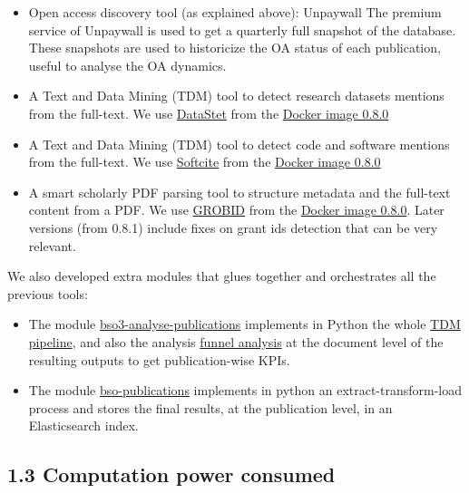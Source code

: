 \documentclass[
]{article}
\begin{document}
\begin{itemize}
\item
  Open access discovery tool (as explained above): Unpaywall The premium
  service of Unpaywall is used to get a quarterly full snapshot of the
  database. These snapshots are used to historicize the OA status of
  each publication, useful to analyse the OA dynamics.
\item
  A Text and Data Mining (TDM) tool to detect research datasets mentions
  from the full-text. We use
  \href{https://github.com/kermitt2/datastet}{DataStet} from the
  \href{https://hub.docker.com/r/grobid/datastet/tags}{Docker image
  0.8.0}
\item
  A Text and Data Mining (TDM) tool to detect code and software mentions
  from the full-text. We use
  \href{https://github.com/softcite/software-mentions}{Softcite} from
  the
  \href{https://hub.docker.com/r/grobid/software-mentions/tags}{Docker
  image 0.8.0}
\item
  A smart scholarly PDF parsing tool to structure metadata and the
  full-text content from a PDF. We use
  \href{https://github.com/kermitt2/grobid}{GROBID} from the
  \href{https://hub.docker.com/r/grobid/grobid/tags}{Docker image
  0.8.0}. Later versions (from 0.8.1) include fixes on grant ids
  detection that can be very relevant.
\end{itemize}

We also developed extra modules that glues together and orchestrates all
the previous tools:

\begin{itemize}
\item
  The module
  \href{https://github.com/dataesr/bso3-analyse-publications/blob/main/application/server/main/tasks.py\#L99}{bso3-analyse-publications}
  implements in Python the whole
  \href{https://github.com/dataesr/bso3-analyse-publications/blob/main/application/server/main/tasks.py\#L99}{TDM
  pipeline}, and also the analysis
  \href{https://github.com/dataesr/bso3-analyse-publications/blob/main/application/server/main/tasks.py\#L176}{funnel
  analysis} at the document level of the resulting outputs to get
  publication-wise KPIs.
\item
  The module
  \href{https://github.com/dataesr/bso-publications}{bso-publications}
  implements in python an extract-transform-load process and stores the
  final results, at the publication level, in an Elasticsearch index.
\end{itemize}

\hypertarget{computation-power-consumed}{%
\subsection{1.3 Computation power
consumed}\label{computation-power-consumed}}
\end{document}
